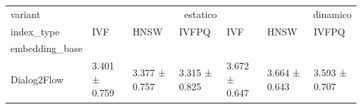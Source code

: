 \begin{tabular}{lllllll}
\toprule
variant & \multicolumn{3}{r}{estatico} & \multicolumn{3}{r}{dinamico} \\
index_type & IVF & HNSW & IVFPQ & IVF & HNSW & IVFPQ \\
embedding_base &  &  &  &  &  &  \\
\midrule
Dialog2Flow & 3.401 ± 0.759 & 3.377 ± 0.757 & 3.315 ± 0.825 & 3.672 ± 0.647 & 3.664 ± 0.643 & 3.593 ± 0.707 \\
\bottomrule
\end{tabular}
